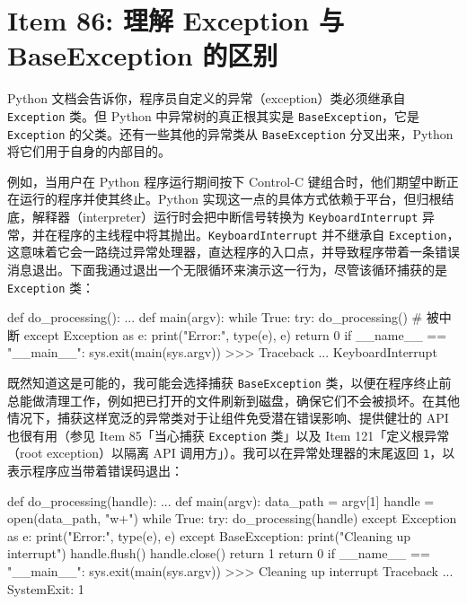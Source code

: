 \section{Item 86: 理解 Exception 与 BaseException 的区别}

Python 文档会告诉你，程序员自定义的异常（exception）类必须继承自 \texttt{Exception} 类。但 Python 中异常树的真正根其实是 \texttt{BaseException}，它是 \texttt{Exception} 的父类。还有一些其他的异常类从 \texttt{BaseException} 分叉出来，Python 将它们用于自身的内部目的。

例如，当用户在 Python 程序运行期间按下 Control-C 键组合时，他们期望中断正在运行的程序并使其终止。Python 实现这一点的具体方式依赖于平台，但归根结底，解释器（interpreter）运行时会把中断信号转换为 \texttt{KeyboardInterrupt} 异常，并在程序的主线程中将其抛出。\texttt{KeyboardInterrupt} 并不继承自 \texttt{Exception}，这意味着它会一路绕过异常处理器，直达程序的入口点，并导致程序带着一条错误消息退出。下面我通过退出一个无限循环来演示这一行为，尽管该循环捕获的是 \texttt{Exception} 类：

\begin{codebox}[python]
def do_processing():
    ...
def main(argv):
    while True:
        try:
            do_processing()  # 被中断
        except Exception as e:
            print("Error:", type(e), e)
    return 0
if __name__ == "__main__":
    sys.exit(main(sys.argv))
>>>
Traceback ...
KeyboardInterrupt
\end{codebox}

既然知道这是可能的，我可能会选择捕获 \texttt{BaseException} 类，以便在程序终止前总能做清理工作，例如把已打开的文件刷新到磁盘，确保它们不会被损坏。在其他情况下，捕获这样宽泛的异常类对于让组件免受潜在错误影响、提供健壮的 API 也很有用（参见 Item 85「当心捕获 \texttt{Exception} 类」以及 Item 121「定义根异常（root exception）以隔离 API 调用方」）。我可以在异常处理器的末尾返回 \texttt{1}，以表示程序应当带着错误码退出：

\begin{codebox}[python]
def do_processing(handle):
    ...
def main(argv):
    data_path = argv[1]
    handle = open(data_path, "w+")
    while True:
        try:
            do_processing(handle)
        except Exception as e:
            print("Error:", type(e), e)
        except BaseException:
            print("Cleaning up interrupt")
            handle.flush()
            handle.close()
            return 1
    return 0
if __name__ == "__main__":
    sys.exit(main(sys.argv))
>>>
Cleaning up interrupt
Traceback ...
SystemExit: 1
\end{codebox}


